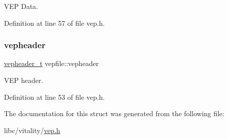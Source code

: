 V\+EP Data. 



Definition at line 57 of file vep.\+h.

\mbox{\label{a00119_a0fa3b39f1e4974d4ed258db1d4b22402_a0fa3b39f1e4974d4ed258db1d4b22402}} 
\subsubsection{\texorpdfstring{vepheader}{vepheader}}
{\footnotesize\ttfamily \hyperlink{a00089_a78392c340e1fe1be344df81d1438b74f_a78392c340e1fe1be344df81d1438b74f}{vepheader\+\_\+t} vepfile\+::vepheader}



V\+EP header. 



Definition at line 53 of file vep.\+h.



The documentation for this struct was generated from the following file\+:\begin{DoxyCompactItemize}
\item 
libc/vitality/\hyperlink{a00089}{vep.\+h}\end{DoxyCompactItemize}
